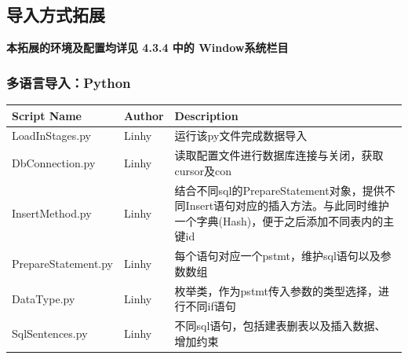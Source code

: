 \documentclass[11pt]{article}
\begin{document}
\subsection{导入方式拓展}

\textbf{本拓展的环境及配置均详见 4.3.4 中的 Window系统栏目}

\subsubsection{多语言导入：Python}
\begin{table}[H]
  \centering
  \label{tab:customer_info}
  \renewcommand{\arraystretch}{1} %
  \begin{tabular}{@{} >{\centering\arraybackslash}m{4cm} >{\centering\arraybackslash}m{1.5cm}>{\centering\arraybackslash}m{10cm} @{}}
    \toprule
    \textbf{Script Name} & \textbf{Author} & \textbf{Description} \\
    \midrule
    LoadInStages.py & Linhy & 运行该py文件完成数据导入\\
    \midrule
    DbConnection.py & Linhy & 读取配置文件进行数据库连接与关闭，获取cursor及con\\
    \midrule
    InsertMethod.py & Linhy & 结合不同sql的PrepareStatement对象，提供不同Insert语句对应的插入方法。与此同时维护一个字典(Hash)，便于之后添加不同表内的主键id\\
    \midrule
    PrepareStatement.py & Linhy & 每个语句对应一个pstmt，维护sql语句以及参数数组\\
    \midrule
    DataType.py & Linhy & 枚举类，作为pstmt传入参数的类型选择，进行不同if语句\\
    \midrule
    SqlSentences.py & Linhy & 不同sql语句，包括建表删表以及插入数据、增加约束\\
    \bottomrule
  \end{tabular}
\end{table}
\end{document}
